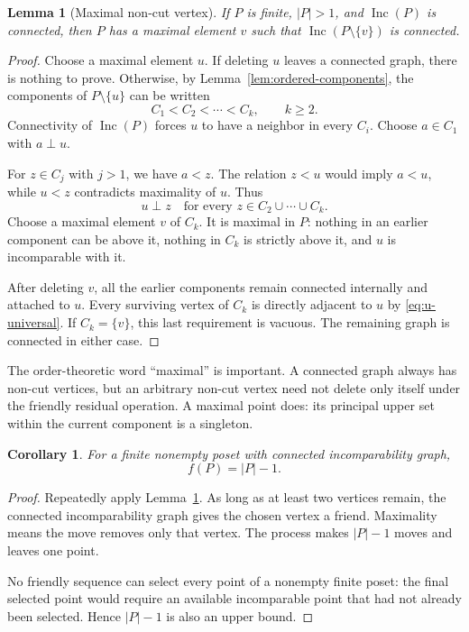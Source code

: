 \documentclass[11pt,letterpaper]{article}
\newtheorem{lemma}[theorem]{Lemma}
\newtheorem{corollary}[theorem]{Corollary}
\theoremstyle{definition}
\theoremstyle{remark}
\newcommand{\Inc}{\operatorname{Inc}}
\begin{document}
\begin{lemma}[Maximal non-cut vertex]\label{lem:noncut}
If $P$ is finite, $|P|>1$, and $\Inc(P)$ is connected, then $P$ has a
maximal element $v$ such that $\Inc(P\setminus\{v\})$ is connected.
\end{lemma}
\begin{proof}
Choose a maximal element $u$. If deleting $u$ leaves a connected graph,
there is nothing to prove. Otherwise, by Lemma~\ref{lem:ordered-components},
the components of $P\setminus\{u\}$ can be written
\[
 C_1<C_2<\cdots<C_k,\qquad k\ge2.
\]
Connectivity of $\Inc(P)$ forces $u$ to have a neighbor in every $C_i$.
Choose $a\in C_1$ with $a\perp u$.

For $z\in C_j$ with $j>1$, we have $a<z$. The relation $z<u$ would imply
$a<u$, while $u<z$ contradicts maximality of $u$. Thus
\begin{equation}\label{eq:u-universal}
 u\perp z\quad\text{for every }z\in C_2\cup\cdots\cup C_k.
\end{equation}
Choose a maximal element $v$ of $C_k$. It is maximal in $P$: nothing in an
earlier component can be above it, nothing in $C_k$ is strictly above it,
and $u$ is incomparable with it.

After deleting $v$, all the earlier components remain connected internally
and attached to $u$. Every surviving vertex of $C_k$ is directly adjacent
to $u$ by \eqref{eq:u-universal}. If $C_k=\{v\}$, this last requirement is
vacuous. The remaining graph is connected in either case.
\end{proof}

The order-theoretic word ``maximal'' is important. A connected graph always
has non-cut vertices, but an arbitrary non-cut vertex need not delete
only itself under the friendly residual operation. A maximal point does:
its principal upper set within the current component is a singleton.

\begin{corollary}\label{cor:connected-finite}
For a finite nonempty poset with connected incomparability graph,
\[
 f(P)=|P|-1.
\]
\end{corollary}
\begin{proof}
Repeatedly apply Lemma~\ref{lem:noncut}. As long as at least two vertices
remain, the connected incomparability graph gives the chosen vertex a
friend. Maximality means the move removes only that vertex. The process
makes $|P|-1$ moves and leaves one point.

No friendly sequence can select every point of a nonempty finite poset:
the final selected point would require an available incomparable point
that had not already been selected. Hence $|P|-1$ is also an upper bound.
\end{proof}
\end{document}
